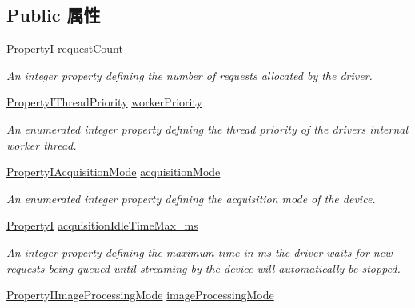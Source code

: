 \subsection*{Public 属性}
\begin{DoxyCompactItemize}
\item 
\hyperlink{group___common_interface_ga12d5e434238ca242a1ba4c6c3ea45780}{Property\+I} \hyperlink{classmv_i_m_p_a_c_t_1_1acquire_1_1_system_settings_aebae5e452b01f037b681faca41fb70ac}{request\+Count}
\begin{DoxyCompactList}\small\item\em An integer property defining the number of requests allocated by the driver. \end{DoxyCompactList}\item 
\hyperlink{group___common_interface_ga3d8854715fb4cb82a7d770ba632ae479}{Property\+I\+Thread\+Priority} \hyperlink{classmv_i_m_p_a_c_t_1_1acquire_1_1_system_settings_aafbaa96af758fe0681ac20ca0746b229}{worker\+Priority}
\begin{DoxyCompactList}\small\item\em An enumerated integer property defining the thread priority of the drivers internal worker thread. \end{DoxyCompactList}\item 
\hyperlink{group___common_interface_gadfe0e124b4ab278eb8bb228d3c4ba63b}{Property\+I\+Acquisition\+Mode} \hyperlink{classmv_i_m_p_a_c_t_1_1acquire_1_1_system_settings_a8d3f1dbe3ba66311d79fdbe217acd9a9}{acquisition\+Mode}
\begin{DoxyCompactList}\small\item\em An enumerated integer property defining the acquisition mode of the device. \end{DoxyCompactList}\item 
\hyperlink{group___common_interface_ga12d5e434238ca242a1ba4c6c3ea45780}{Property\+I} \hyperlink{classmv_i_m_p_a_c_t_1_1acquire_1_1_system_settings_a2903927f7e84385d4fb1d4241a54084b}{acquisition\+Idle\+Time\+Max\+\_\+ms}
\begin{DoxyCompactList}\small\item\em An integer property defining the maximum time in ms the driver waits for new requests being queued until streaming by the device will automatically be stopped. \end{DoxyCompactList}\item 
\hyperlink{group___common_interface_ga12e3e1568fb58b1cb24383af267c53f7}{Property\+I\+Image\+Processing\+Mode} \hyperlink{classmv_i_m_p_a_c_t_1_1acquire_1_1_system_settings_a0e9c91668ae90fb631d5d69c32395fce}{image\+Processing\+Mode}

\end{DoxyCompactItemize}
